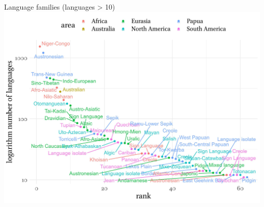 \documentclass[13pt, t]{beamer}
\begin{document}
\begin{frame}{Language families (languages > 10)}
\includegraphics[width=\linewidth]{images/04_families_by_area}
\end{frame}
\end{document}
